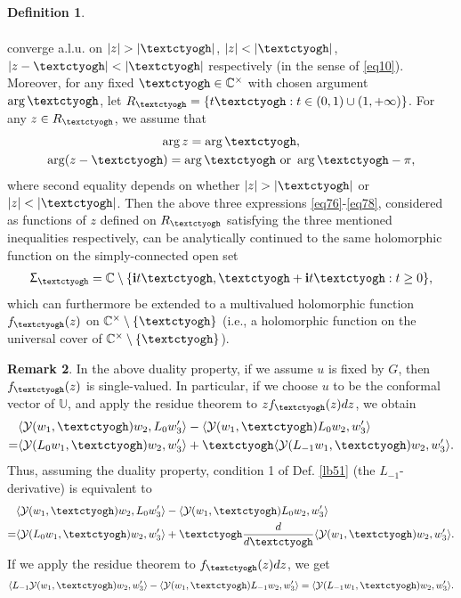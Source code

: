 \documentclass[11pt,b5paper,notitlepage]{article}
\theoremstyle{definition}
\newtheorem{df}{Definition}[subsection]
\newtheorem{rem}[df]{Remark}
\theoremstyle{plain}
\newcommand{\mc}{\mathcal}
\newcommand{\bk}[1]{\langle {#1}\rangle}
\newcommand{\im}{\mathbf{i}}
\newcommand{\Ubb}{\mathbb U}
\newcommand{\Cbb}{\mathbb C}
\newcommand{\tipaz}{\text{\textctyogh}}
\numberwithin{equation}{subsection}
\begin{document}
\begin{df}
\begin{enumerate}
\begin{gather}
\end{gather}
converge a.l.u.  on $|z|>|\tipaz|$, $|z|<|\tipaz|$, $|z-\tipaz|<|\tipaz|$ respectively (in the sense of \eqref{eq10}). Moreover, for any fixed $\tipaz\in\Cbb^\times$ with chosen argument $\arg \tipaz$, let $R_{\tipaz}=\{t\tipaz:t\in(0,1)\cup (1,+\infty)\}$. For any $z\in R_{\tipaz}$, we assume that 
\begin{gather}
\begin{array}{c}
\arg z=\arg\tipaz,\\[0.7ex]
\arg(z-\tipaz)=\arg \tipaz\text{ or }\arg \tipaz-\pi,
\end{array}	\label{eq82}
\end{gather}
where second equality depends on whether $|z|>|\tipaz|$ or $|z|<|\tipaz|$. Then the above three expressions \eqref{eq76}-\eqref{eq78}, considered as functions of $z$ defined on $R_{\tipaz}$ satisfying the three mentioned inequalities respectively, can be analytically continued to the same holomorphic function on the simply-connected open set
\begin{align*}
\Upsigma_\tipaz=\Cbb\setminus\{\im t\tipaz,\tipaz+\im t\tipaz:t\geq 0\},	
\end{align*}
which can furthermore be extended to a multivalued holomorphic function $f_{\tipaz}(z)$ on $\Cbb^\times\setminus\{\tipaz\}$ (i.e., a holomorphic function on the universal cover of $\Cbb^\times\setminus\{\tipaz\}$).
\end{enumerate}
\end{df}

\begin{rem}\label{lb55}
In the above duality property, if we assume $u$ is fixed by $G$, then $f_\tipaz(z)$ is single-valued. In particular, if we choose $u$ to be the conformal vector of $\Ubb$, and apply the residue theorem to $zf_\tipaz(z)dz$, we obtain
\begin{align*}
	&\bk{\mc Y(w_1,\tipaz)w_2,L_0w_3'}-\bk{\mc Y(w_1,\tipaz)L_0w_2,w_3'}\nonumber\\
	=&	\bk{\mc Y(L_0w_1,\tipaz)w_2,w_3'}+\tipaz\bk{\mc Y(L_{-1}w_1,\tipaz)w_2,w_3'}.
\end{align*}
Thus, assuming the duality property, condition 1  of Def. \ref{lb51}  (the $L_{-1}$-derivative) is equivalent to
\begin{align}
	&\bk{\mc Y(w_1,\tipaz)w_2,L_0w_3'}-\bk{\mc Y(w_1,\tipaz)L_0w_2,w_3'}\nonumber\\
	=&	\bk{\mc Y(L_0w_1,\tipaz)w_2,w_3'}+\tipaz\frac d{d\tipaz}\bk{\mc Y(w_1,\tipaz)w_2,w_3'}\label{eq79}.
\end{align}	
If we apply the residue theorem to $f_\tipaz(z)dz$, we get
\begin{align}
\bk{L_{-1}\mc Y(w_1,\tipaz)w_2,w_3'}-\bk{\mc Y(w_1,\tipaz)L_{-1}w_2,w_3'}=\bk{\mc Y(L_{-1}w_1,\tipaz)w_2,w_3'}.\label{eq98}	
\end{align}
\end{rem}	
\end{document}
